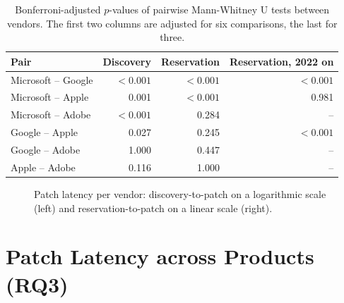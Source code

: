 \begin{table}[h]
    \centering
    \caption{Bonferroni-adjusted $p$-values of pairwise Mann-Whitney U tests between vendors. The first two columns are adjusted for six comparisons, the last for three.}
    \label{tab:pairwise}
    \begin{tabular}{lrrr}
        \toprule
        Pair & Discovery & Reservation & Reservation, 2022 on \\
        \midrule
        Microsoft -- Google & $<0.001$ & $<0.001$ & $<0.001$ \\
        Microsoft -- Apple  & 0.001 & $<0.001$ & 0.981 \\
        Microsoft -- Adobe  & $<0.001$ & 0.284 & -- \\
        Google -- Apple     & 0.027 & 0.245 & $<0.001$ \\
        Google -- Adobe     & 1.000 & 0.447 & -- \\
        Apple -- Adobe      & 0.116 & 1.000 & -- \\
        \bottomrule
    \end{tabular}
\end{table}

\begin{figure}[h]
    \centering
    \caption{Patch latency per vendor: discovery-to-patch on a logarithmic scale (left) and reservation-to-patch on a linear scale (right).}
    \label{fig:latency-by-vendor}
\end{figure}

\section{Patch Latency across Products (RQ3)}

